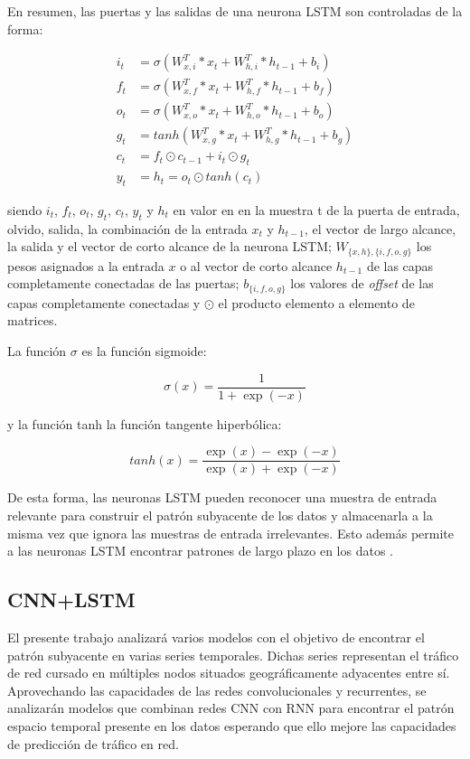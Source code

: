 En resumen, las puertas y las salidas de una neurona LSTM son controladas de la forma:

\begin{align*}
	i_t&=\sigma(W_{x,i}^T*x_t + W_{h,i}^T*h_{t-1}+b_i)\\
	f_t&=\sigma(W_{x,f}^T*x_t + W_{h,f}^T*h_{t-1}+b_f)\\
	o_t&=\sigma(W_{x,o}^T*x_t + W_{h,o}^T*h_{t-1}+b_o)\\
	g_t&=tanh(W_{x,g}^T*x_t + W_{h,g}^T*h_{t-1}+b_g)\\
	c_t&=f_t\odot c_{t-1}+i_t \odot g_t\\
	y_t&=h_t=o_t \odot tanh(c_t)
\end{align*}

siendo $i_t$, $f_t$, $o_t$, $g_t$, $c_t$, $y_t$ y $h_t$ en valor en en la muestra t de la puerta de entrada, olvido, salida, la combinación de la entrada $x_t$ y $h_{t-1}$, el vector de largo alcance, la salida y el vector de corto alcance de la neurona LSTM; $W_{\{x,h\},\{i,f,o,g\}}$ los pesos asignados a la entrada $x$ o al vector de corto alcance $h_{t-1}$ de las capas completamente conectadas de las puertas; $b_{\{i,f,o,g\}}$ los valores de \textit{offset} de las capas completamente conectadas y $\odot$ el producto elemento a elemento de matrices.

La función $\sigma$ es la función sigmoide:

\begin{equation*}
	\sigma(x)=\frac{1}{1+\exp(-x)}
\end{equation*}

y la función tanh la función tangente hiperbólica:

\begin{equation*}
	tanh(x)=\frac{\exp(x)-\exp(-x)}{\exp(x)+\exp(-x)}
\end{equation*}

De esta forma, las neuronas LSTM pueden reconocer una muestra de entrada relevante para construir el patrón subyacente de los datos y almacenarla a la misma vez que ignora las muestras de entrada irrelevantes. Esto además permite a las neuronas LSTM encontrar patrones de largo plazo en los datos \cite{SKIMAcasaseca,lstm,machinelearningbook,rnn,rnn1,rnn2}.


\subsection{CNN+LSTM}
El presente trabajo analizará varios modelos con el objetivo de encontrar el patrón subyacente en varias series temporales. Dichas series representan el tráfico de red cursado en múltiples nodos situados geográficamente adyacentes entre sí. Aprovechando las capacidades de las redes convolucionales y recurrentes, se analizarán modelos que combinan redes CNN con RNN para encontrar el patrón espacio temporal presente en los datos esperando que ello mejore las capacidades de predicción de tráfico en red.

